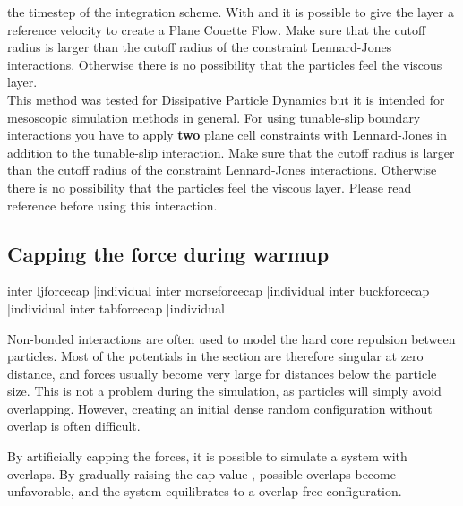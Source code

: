 the timestep of the integration scheme. With   and 
it is possible to give the layer a reference velocity to create a Plane
Couette Flow.
Make sure that the cutoff radius  is larger than the
cutoff radius of the constraint Lennard-Jones interactions. Otherwise there is
no possibility that the particles feel the viscous layer.\\
This method was tested for Dissipative Particle Dynamics but it is intended
for mesoscopic simulation methods in general. For using tunable-slip boundary
interactions you have to apply {\bf two} plane cell constraints with
Lennard-Jones in addition to the tunable-slip interaction. Make sure that the
cutoff radius  is larger than the cutoff radius of the 
constraint Lennard-Jones interactions. Otherwise there is
no possibility that the particles feel the viscous layer.
Please read reference \cite{smiatek08a} before using this interaction.

\subsection{Capping the force during warmup}
\label{sec:forcecap}

\begin{essyntax}
   inter ljforcecap |individual
   inter morseforcecap |individual
   inter buckforcecap |individual
   inter tabforcecap |individual
  \begin{features}
  \end{features}  
\end{essyntax}

Non-bonded interactions are often used to model the hard core
repulsion between particles. Most of the potentials in the section are
therefore singular at zero distance, and forces usually become very
large for distances below the particle size. This is not a problem
during the simulation, as particles will simply avoid overlapping.
However, creating an initial dense random configuration without
overlap is often difficult.

By artificially capping the forces, it is possible to simulate a
system with overlaps. By gradually raising the cap value
, possible overlaps become unfavorable, and the
system equilibrates to a overlap free configuration.

